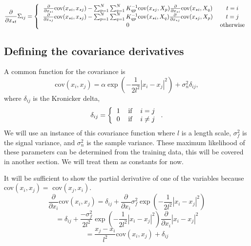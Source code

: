 \documentclass[phd,tocprelim]{cornell}
\begin{document}
\begin{equation}
  \frac{\partial}{\partial x_{\star t}} \Sigma_{ij} = \left\{ \begin{tabular}{cc}
                                                       $\frac{\partial}{\partial x_{\star i}} \mbox{cov}(x_{\star i}, x_{\star j}) - \sum_{p = 1}^{N} \sum_{q = 1}^{N} K^{-1}_{qp} \mbox{cov}(x_{\star j}, X_{p}) \frac{\partial}{\partial x_{\star i}} \mbox{cov}(x_{\star i}, X_{q})$ & $t = i$ \\
							$\frac{\partial}{\partial x_{\star j}} \mbox{cov}(x_{\star i}, x_{\star j}) - \sum_{p = 1}^{N} \sum_{q = 1}^{N} K^{-1}_{qp} \mbox{cov}(x_{\star i}, X_{q}) \frac{\partial}{\partial x_{\star j}} \mbox{cov}(x_{\star j}, X_{p})$ & $t = j$ \\
							$0$ & otherwise
                                                      \end{tabular} \right.
\end{equation}

\subsection{Defining the covariance derivatives}

A common function for the covariance is
\begin{equation}
    \mbox{cov}(x_{i}, x_{j}) = \alpha \exp\left( -\frac{1}{2l^{2}} |x_{i} - x_{j}|^{2}\right)  + \sigma_{n}^{2}\delta_{ij},
\end{equation}
where $\delta_{ij}$ is the Kronicker delta,
\begin{equation}
    \delta_{ij} = \left\{ \begin{tabular}{ccc}
        1 & if & $i=j$ \\
        0 & if & $i\neq j$
    \end{tabular} \right..
\end{equation}
We will use an instance of this covariance function where $l$ is a length scale, $\sigma_{f}^{2}$ is the signal variance, and $\sigma_{n}^{2}$ is the sample variance. These maximum likelihood of these parameters can be determined from the training data, this will be covered in another section. We will treat them as constants for now.

It will be sufficient to show the partial derivative of one of the variables because cov$(x_{i}, x_{j}) = $ cov$(x_{j}, x_{i})$.
\begin{equation}
    \frac{\partial}{\partial x_{i}} \mbox{cov}(x_{i}, x_{j}) = \delta_{ij} + \frac{\partial}{\partial x_{i}} \sigma_{f}^{2} \exp\left( - \frac{1}{2l^{2}} |x_{i} - x_{j}|^{2}\right)
\end{equation}
\begin{equation}
    =  \delta_{ij} + \frac{-\sigma_{f}^{2}}{2l^{2}} \exp\left( - \frac{1}{2l^{2}} |x_{i} - x_{j}|^{2}\right) \frac{\partial}{\partial x_{i}} |x_{i} - x_{j}|^{2}
\end{equation}
\begin{equation}
    =  \frac{x_{j} - x_{i}}{l^{2}} \mbox{cov}(x_{i}, x_{j}) + \delta_{ij}
\end{equation}
\end{document}
